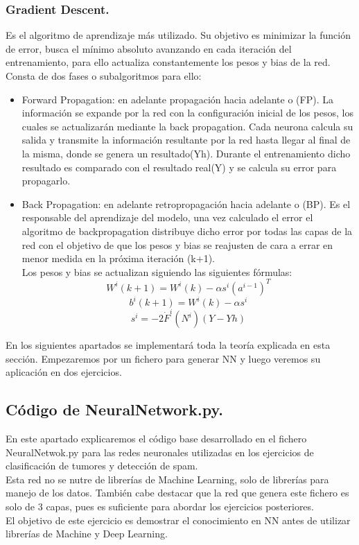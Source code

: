 \documentclass[a4paper,10pt]{article}
\begin{document}
\subsubsection{Gradient Descent.}
Es el algoritmo de aprendizaje más utilizado. Su objetivo es minimizar la función de error, busca el mínimo absoluto avanzando en cada iteración del entrenamiento, para ello actualiza constantemente los pesos y bias de la red. Consta de dos fases o subalgoritmos para ello: 
\begin{itemize}
    \item Forward Propagation: en adelante propagación hacia adelante o (FP). La información se expande por la red con la configuración inicial de los pesos, los cuales se actualizarán mediante la back propagation. Cada neurona calcula su salida y transmite la información resultante por la red hasta llegar al final de la misma, donde se genera un resultado(Yh). Durante el entrenamiento dicho resultado es comparado con el resultado real(Y) y se calcula su error para propagarlo.
    \item Back Propagation: en adelante retropropagación hacia adelante o (BP). Es el responsable del aprendizaje del modelo, una vez calculado el error el algoritmo de backpropagation distribuye dicho error por todas las capas de la red con el objetivo de que los pesos y bias se reajusten de cara a errar en menor medida en la próxima iteración (k+1). \\Los pesos y bias se actualizan siguiendo las siguientes fórmulas:
    \[
    W^i (k+1) = W^i (k) - \alpha s^i (a^{i-1})^T
    \]
    \[
    b^i (k+1) = W^i (k) - \alpha s^i
    \]
    \[
    s^i = -2\dot{F}^i(N^i)(Y-Yh)
    \]
    
\end{itemize}

En los siguientes apartados se implementará toda la teoría explicada en esta sección. Empezaremos por un fichero para generar NN y luego veremos su aplicación en dos ejercicios.
\subsection{Código de NeuralNetwork.py.}
En este apartado explicaremos el código base desarrollado en el fichero NeuralNetwok.py para las redes neuronales utilizadas en los ejercicios de clasificación de tumores y detección de spam.\\ Esta red no se nutre de librerías de Machine Learning, solo de librerías para manejo de los datos. También cabe destacar que la red que genera este fichero es solo de 3 capas, pues es suficiente para abordar los ejercicios posteriores.\\ El objetivo de este ejercicio es demostrar el conocimiento en NN antes de utilizar librerías de Machine y Deep Learning.
\end{document}
